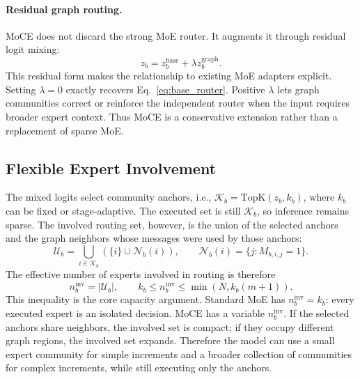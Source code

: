 \documentclass{article}
\theoremstyle{definition}
\theoremstyle{remark}
\begin{document}
\paragraph{Residual graph routing.}
MoCE does not discard the strong MoE router. It augments it through residual logit mixing:
\begin{equation}
    z_{b}=z^{\mathrm{base}}_{b}+\lambda z^{\mathrm{graph}}_{b}.
    \label{eq:residual_logits}
\end{equation}
This residual form makes the relationship to existing MoE adapters explicit. Setting $\lambda=0$ exactly recovers Eq.~\eqref{eq:base_router}. Positive $\lambda$ lets graph communities correct or reinforce the independent router when the input requires broader expert context. Thus MoCE is a conservative extension rather than a replacement of sparse MoE.

\subsection{Flexible Expert Involvement}
The mixed logits select community anchors, i.e., $\mathcal{K}_b=\mathrm{TopK}(z_b,k_b)$, where $k_b$ can be fixed or stage-adaptive. The executed set is still $\mathcal{K}_b$, so inference remains sparse. The involved routing set, however, is the union of the selected anchors and the graph neighbors whose messages were used by those anchors:
\begin{equation}
    \mathcal{U}_b=\bigcup_{i\in\mathcal{K}_b}\left(\{i\}\cup\mathcal{N}_b(i)\right),
    \qquad
    \mathcal{N}_b(i)=\{j:M_{b,i,j}=1\}.
    \label{eq:community_union}
\end{equation}
The effective number of experts involved in routing is therefore
\begin{equation}
    n^{\mathrm{inv}}_b=|\mathcal{U}_b|,
    \qquad
    k_b\le n^{\mathrm{inv}}_b\le \min(N,k_b(m+1)).
    \label{eq:effective_involved_number}
\end{equation}
This inequality is the core capacity argument. Standard MoE has $n^{\mathrm{inv}}_b=k_b$: every executed expert is an isolated decision. MoCE has a variable $n^{\mathrm{inv}}_b$. If the selected anchors share neighbors, the involved set is compact; if they occupy different graph regions, the involved set expands. Therefore the model can use a small expert community for simple increments and a broader collection of communities for complex increments, while still executing only the anchors.
\end{document}

